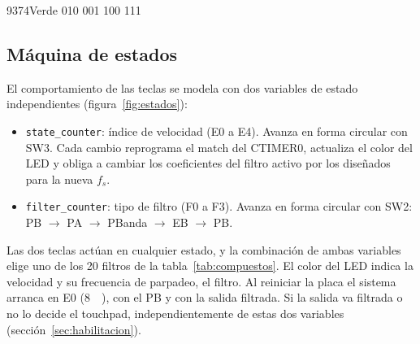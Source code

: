 \documentclass[11pt,a4paper]{article}
\begin{document}
\begin{table}[H]
\centering
\caption{Velocidades de muestreo, valor de match programado y color del LED.}
\label{tab:fs}
\begin{tablamuestreo}
   {9374}{Verde}   {0}{1}{0}
      {0}{0}{1}
      {1}{0}{0}
    {1}{1}{1}
\end{tablamuestreo}
\end{table}

\subsection{Máquina de estados}

El comportamiento de las teclas se modela con dos variables de estado
independientes (figura~\ref{fig:estados}):

\begin{itemize}[nosep]
  \item \texttt{state\_counter}: índice de velocidad (E0 a E4). Avanza en
        forma circular con SW3. Cada cambio reprograma el match del CTIMER0,
        actualiza el color del LED y obliga a cambiar los coeficientes del
        filtro activo por los diseñados para la nueva $f_s$.
  \item \texttt{filter\_counter}: tipo de filtro (F0 a F3). Avanza en forma
        circular con SW2: PB $\rightarrow$ PA $\rightarrow$ PBanda
        $\rightarrow$ EB $\rightarrow$ PB.
\end{itemize}

Las dos teclas actúan en cualquier estado, y la combinación de ambas
variables elige uno de los 20 filtros de la tabla~\ref{tab:compuestos}. El
color del LED indica la velocidad y su frecuencia de parpadeo, el filtro. Al
reiniciar la placa el sistema arranca en E0 (\qty{8}{\kilo\sps}), con el PB y
con la salida filtrada. Si la salida va filtrada o no lo decide el touchpad,
independientemente de estas dos variables (sección~\ref{sec:habilitacion}).
\end{document}
